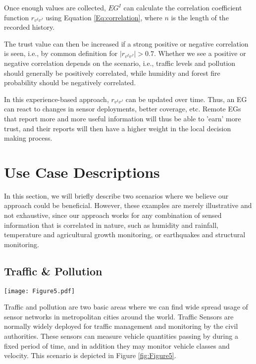 \documentclass[onecolumn]{jaise2e}
\begin{document}
Once enough values are collected, $EG^I$ can calculate the correlation coefficient function $r_{v^I v^J}$ using Equation \ref{Eq:correlation}, where $n$ is the length of the recorded history.


The trust value can then be increased if a strong positive or negative correlation is seen, i.e., by common definition for $|r_{v^I v^J}| > 0.7$. Whether we see a positive or negative correlation depends on the scenario, i.e., traffic levels and pollution should generally be positively correlated, while humidity and forest fire probability should be negatively correlated.

In this experience-based approach, $r_{v^I v^J}$ can be updated over time. Thus, an EG can react to changes in sensor deployments, better coverage, etc. Remote EGs that report more and more useful information will thus be able to 'earn' more trust, and their reports will then have a higher weight in the local decision making process.




\section{Use Case Descriptions}\label{sec:usecases}

In this section, we will briefly describe two scenarios where we believe our approach could be beneficial. However, these examples are merely illustrative and not exhaustive, since our approach works for any combination of sensed information that is correlated in nature, such as humidity and rainfall, temperature and agricultural growth monitoring, or earthquakes and structural monitoring.

\subsection{Traffic \& Pollution}

\begin{figure*}[t]
\centering
\texttt{[image: Figure5.pdf]} 
\caption{Traffic \& Pollution Scenario}
\label{fig:Figure5}
\end{figure*}


Traffic and pollution are two basic areas where we can find wide spread usage of sensor networks in metropolitan cities around the world. Traffic Sensors are normally widely deployed for traffic management and monitoring by the civil authorities. These sensors can measure vehicle quantities passing by during a fixed period of time, and in addition they may monitor vehicle classes and velocity. This scenario is depicted in Figure \ref{fig:Figure5}.
\end{document}
